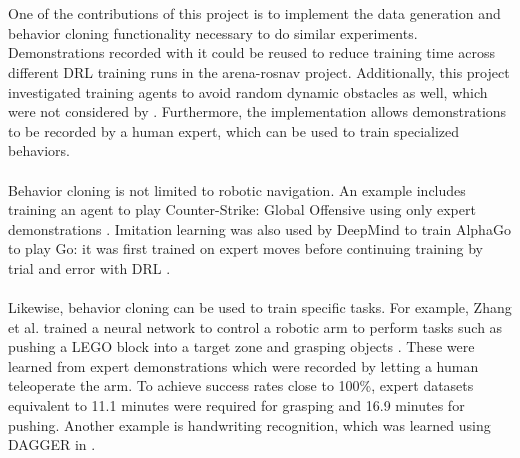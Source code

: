 \\\\\noindent 
One of the contributions of this project is to implement the data generation and behavior cloning functionality necessary to do similar experiments. Demonstrations recorded with it could be reused to reduce training time across different DRL training runs in the arena-rosnav project. Additionally, this project investigated training agents to avoid random dynamic obstacles as well, which were not considered by \citep{pfeiffer1, pfeiffer2}. Furthermore, the implementation allows demonstrations to be recorded by a human expert, which can be used to train specialized behaviors.
\\\\\noindent 
Behavior cloning is not limited to robotic navigation. An example includes training an agent to play Counter-Strike: Global Offensive using only expert demonstrations \citep{counterstrike}.
Imitation learning was also used by DeepMind to train AlphaGo to play Go: it was first trained on expert moves before continuing training by trial and error with DRL \citep{silver}.
\\\\\noindent 
Likewise, behavior cloning can be used to train specific tasks. For example, Zhang et al. trained a neural network to control a robotic arm to perform tasks such as pushing a LEGO block into a target zone and grasping objects \citep{zhang}. These were learned from expert demonstrations which were recorded by letting a human teleoperate the arm. To achieve success rates close to 100\%, expert datasets equivalent to 11.1 minutes were required for grasping and 16.9 minutes for pushing.
Another example is handwriting recognition, which was learned using DAGGER in \citep{dagger}.
